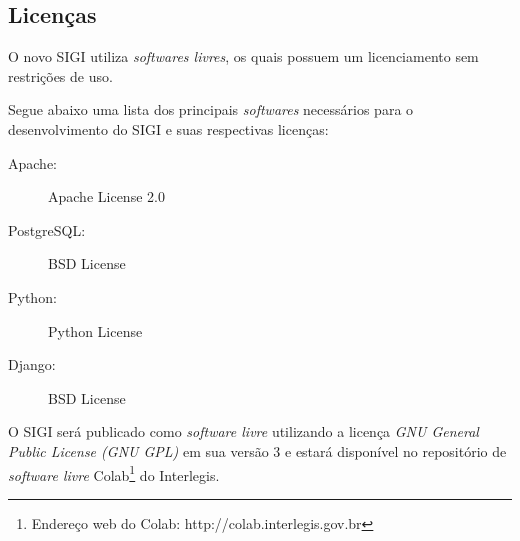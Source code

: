 \subsection{Licenças}
O novo SIGI utiliza \emph{softwares livres}, os quais possuem um
licenciamento sem restrições de uso.

Segue abaixo uma lista dos principais \emph{softwares} necessários
para o desenvolvimento do SIGI e suas respectivas licenças:

\begin{description}
\item[Apache:] Apache License 2.0
\item[PostgreSQL:] BSD License
\item[Python:] Python License
\item[Django:] BSD License
\end{description}

O SIGI será publicado como \emph{software livre} utilizando a licença
\textit{GNU General Public License (GNU GPL)} em sua versão 3 e estará
disponível no repositório de \emph{software livre}
Colab\footnote{Endereço web do Colab: http://colab.interlegis.gov.br}
do Interlegis.
%
%
